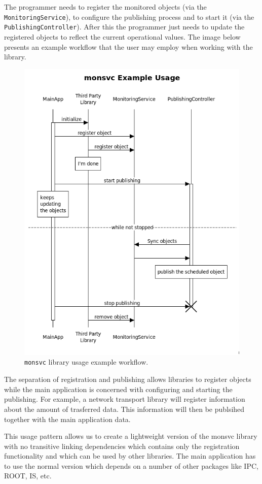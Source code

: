 The programmer needs to register the monitored objects (via the {\tt MonitoringService}), to configure the publishing process and to start it (via the {\tt PublishingController}). After this the programmer just needs to update the registered objects to reflect the current operational values. The image below presents an example workflow that the user may employ when working with the library.  

\begin{figure}[ht!]
\centering
\includegraphics[scale=0.6]{../Images/workflow.png}
\caption{{\tt monsvc} library usage example workflow.}
\end{figure}

The separation of registration and publishing allows libraries to register objects while the main application is concerned with configuring and starting the publishing. For example, a network transport library will register information about the amount of trasferred data. This information will then be publsihed together with the main application data.

This usage pattern allows us to  create a lightweight version of the monsvc library with no transitive linking dependencies which contains only the registration functionality and which can be used by other libraries. The main application has to use the normal version which depends on a number of other packages like IPC, ROOT, IS, etc.
